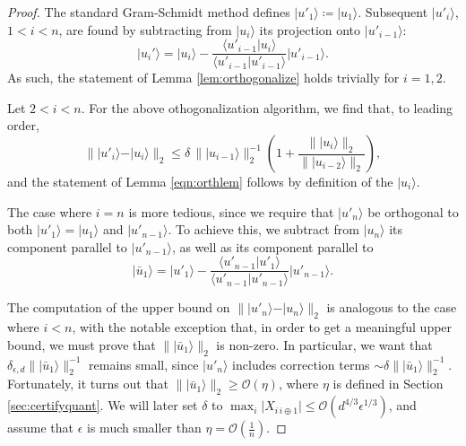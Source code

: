\begin{proof}
The standard Gram-Schmidt method defines $\vert u'_1 \rangle \coloneqq \vert u_1 \rangle$. Subsequent $\vert u'_i \rangle$, $1< i < n$, are found by subtracting from $\vert u_i \rangle$ its projection onto $\vert u'_{i-1}\rangle$:
\begin{equation}
\vert u_i' \rangle = \vert  u_i \rangle - \frac{\langle u'_{i-1} \vert u_i \rangle}{\langle  u'_{i-1} \vert  u'_{i-1} \rangle}\vert  u'_{i-1} \rangle.
\end{equation}
As such, the statement of Lemma \ref{lem:orthogonalize} holds trivially for $i=1,2$. 

Let $2<i<n$. For the above othogonalization algorithm, we find that, to leading order,
\begin{equation}
\|\vert u'_i \rangle - \vert u_i \rangle\|_2 \leq \delta\, \|\vert u_{i-1}\rangle\|_2^{-1}\left(1+\frac{\|\vert u_{i} \rangle \|_2}{\|\vert u_{i-2}\rangle \|_2}\right),
\end{equation}
and the statement of Lemma \ref{eqn:orthlem} follows by definition of the $\vert u_i \rangle$. 

The case where $i=n$ is more tedious, since we require that $\vert u'_n \rangle$ be orthogonal to both $\vert u'_1 \rangle = \vert u_1 \rangle$  and $\vert u'_{n-1} \rangle$. To achieve this, we subtract from $\vert u_n \rangle$ its component parallel to $\vert u'_{n-1} \rangle$, as well as its component parallel to 
\begin{equation}
\vert \bar{u}_1 \rangle=\vert u'_1 \rangle-\frac{\langle u'_{n-1} \vert u'_{1} \rangle}{\langle u'_{n-1}\vert u'_{n-1}\rangle}\vert u'_{n-1} \rangle.
\end{equation}

The computation of the upper bound on $\|\vert u'_n \rangle - \vert u_n\rangle \|_2$ is analogous to the case where $i<n$, with the notable exception that, in order to get a meaningful upper bound, we must prove that $\|\vert \bar{u}_1 \rangle \|_2$ is non-zero. In particular, we want that $\delta_{\epsilon,d}\|\vert \bar{u}_1 \rangle \|_2^{-1}$ remains small, since $\vert u'_n \rangle$ includes correction terms $\sim \delta \| \vert \bar{u}_1 \rangle \|_2^{-1}$. Fortunately, it turns out that $\| \vert \bar{u}_1 \rangle \|_2 \geq \mathcal{O}\left(\eta\right)$, where $\eta$ is defined in Section \ref{sec:certifyquant}. We will later set $\delta$ to $\max_i \vert X_{i\,i\oplus 1}\vert \leq \mathcal{O}\left(d^{4/3}\epsilon^{1/3}\right)$, and assume that $\epsilon$ is much smaller than $\eta=\mathcal{O}(\frac{1}{n})$.


\end{proof}
